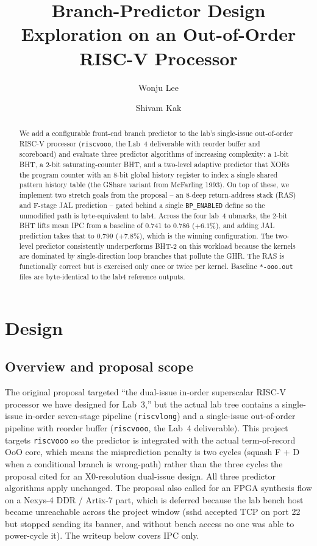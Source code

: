 \documentclass[10pt]{article}
\title{\vspace{-1.0cm}
Branch-Predictor Design Exploration on an
Out-of-Order RISC-V Processor\\
}
\author{%
  Wonju Lee \and Shivam Kak\\
}
\date{}
\begin{document}
\maketitle

\begin{abstract}
We add a configurable front-end branch predictor to the lab's
single-issue out-of-order RISC-V processor (\texttt{riscvooo}, the
Lab~4 deliverable with reorder buffer and scoreboard) and evaluate
three predictor algorithms of increasing complexity: a 1-bit BHT,
a 2-bit saturating-counter BHT, and a two-level adaptive predictor
that XORs the program counter with an 8-bit global history register
to index a single shared pattern history table (the GShare variant
from McFarling 1993). On top of these, we implement two stretch
goals from the proposal -- an 8-deep return-address stack (RAS) and
F-stage JAL prediction -- gated behind a single
\texttt{BP\_ENABLED} define so the unmodified path is byte-equivalent
to lab4. Across the four lab~4 ubmarks, the 2-bit BHT lifts mean IPC
from a baseline of 0.741 to 0.786 ($+6.1\%$), and adding JAL
prediction takes that to 0.799 ($+7.8\%$), which is the winning
configuration. The two-level predictor consistently underperforms
BHT-2 on this workload because the kernels are dominated by
single-direction loop branches that pollute the GHR. The RAS is
functionally correct but is exercised only once or twice per kernel.
Baseline \texttt{*-ooo.out} files are byte-identical to the lab4
reference outputs.
\end{abstract}

\section{Design}

\subsection{Overview and proposal scope}

The original proposal targeted ``the dual-issue in-order superscalar
RISC-V processor we have designed for Lab~3,'' but the actual lab tree
contains a single-issue in-order seven-stage pipeline
(\texttt{riscvlong}) and a single-issue out-of-order pipeline with
reorder buffer (\texttt{riscvooo}, the Lab~4 deliverable). This
project targets \texttt{riscvooo} so the predictor is integrated with
the actual term-of-record OoO core, which means the misprediction
penalty is two cycles (squash F + D when a conditional branch is
wrong-path) rather than the three cycles the proposal cited for an
X0-resolution dual-issue design. All three predictor algorithms apply
unchanged. The proposal also called for an FPGA synthesis flow on a
Nexys-4 DDR / Artix-7 part, which is deferred because the lab bench
host became unreachable across the project window (sshd accepted TCP
on port 22 but stopped sending its banner, and without bench access
no one was able to power-cycle it). The writeup below covers IPC
only.
\end{document}

